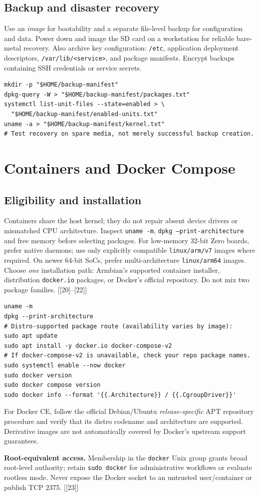 \documentclass[10pt,oneside,openany]{report}
\newcommand{\code}[1]{\texttt{#1}}
\newcommand{\smallref}[1]{{\sffamily\scriptsize\color{slate}[#1]}}
\begin{document}
\section{Backup and disaster recovery}
Use an \emph{image} for bootability and a separate file-level backup for configuration and data. Power down and image the SD card on a workstation for reliable bare-metal recovery. Also archive key configuration: \code{/etc}, application deployment descriptors, \code{/var/lib/<service>}, and package manifests. Encrypt backups containing SSH credentials or service secrets.
\begin{lstlisting}[style=sh]
mkdir -p "$HOME/backup-manifest"
dpkg-query -W > "$HOME/backup-manifest/packages.txt"
systemctl list-unit-files --state=enabled > \
  "$HOME/backup-manifest/enabled-units.txt"
uname -a > "$HOME/backup-manifest/kernel.txt"
# Test recovery on spare media, not merely successful backup creation.
\end{lstlisting}

\chapter{Containers and Docker Compose}
\section{Eligibility and installation}
Containers share the host kernel; they do not repair absent device drivers or mismatched CPU architecture. Inspect \code{uname -m}, \code{dpkg --print-architecture} and free memory before selecting packages. For low-memory 32-bit Zero boards, prefer native daemons; use only explicitly compatible \code{linux/arm/v7} images where required. On newer 64-bit SoCs, prefer multi-architecture \code{linux/arm64} images. Choose \emph{one} installation path: Armbian's supported container installer, distribution \code{docker.io} packages, or Docker's official repository. Do not mix two package families. \smallref{[20]--[22]}
\begin{lstlisting}[style=sh]
uname -m
dpkg --print-architecture
# Distro-supported package route (availability varies by image):
sudo apt update
sudo apt install -y docker.io docker-compose-v2
# If docker-compose-v2 is unavailable, check your repo package names.
sudo systemctl enable --now docker
sudo docker version
sudo docker compose version
sudo docker info --format '{{.Architecture}} / {{.CgroupDriver}}'
\end{lstlisting}
For Docker CE, follow the official Debian/Ubuntu \emph{release-specific} APT repository procedure and verify that its distro codename and architecture are supported. Derivative images are not automatically covered by Docker's upstream support guarantees.
\begin{cautionbox}
\textbf{Root-equivalent access.} Membership in the \code{docker} Unix group grants broad root-level authority; retain \code{sudo docker} for administrative workflows or evaluate rootless mode. Never expose the Docker socket to an untrusted user/container or publish TCP 2375. \smallref{[23]}
\end{cautionbox}
\end{document}
